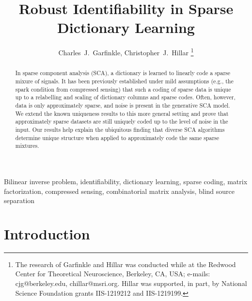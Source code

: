 \documentclass[journal, onecolumn]{IEEEtran}
\begin{document}
\title{Robust Identifiability in Sparse Dictionary Learning}

\author{Charles~J.~Garfinkle,  Christopher~J.~Hillar%
\thanks{The research of Garfinkle and Hillar was conducted while at the Redwood Center for Theoretical Neuroscience, Berkeley, CA, USA; e-mails: cjg@berkeley.edu, chillar@msri.org.  Hillar was supported, in part, by National Science Foundation grants IIS-1219212 and IIS-1219199.}}%

\maketitle

\begin{abstract}
In sparse component analysis (SCA), a dictionary is learned to linearly code a sparse mixure of signals.  It has been previously established  under mild assumptions (e.g., the spark condition from compressed sensing) that such a coding of sparse data is unique up to a relabelling and scaling of dictionary columns and sparse codes.  Often, however, data is only approximately sparse, and noise is present in the generative SCA model.  We extend the known uniqueness results to this more general setting and prove that approximately sparse datasets are still uniquely coded up to the level of noise in the input.  Our results help explain the ubiquitous finding that diverse SCA algorithms determine unique structure when applied to approximately code the same sparse mixtures.
\end{abstract}

\begin{IEEEkeywords}
Bilinear inverse problem, identifiability, dictionary learning, sparse coding, matrix factorization, compressed sensing, combinatorial matrix analysis, blind source separation
\end{IEEEkeywords}


\section{Introduction}
\end{document}
